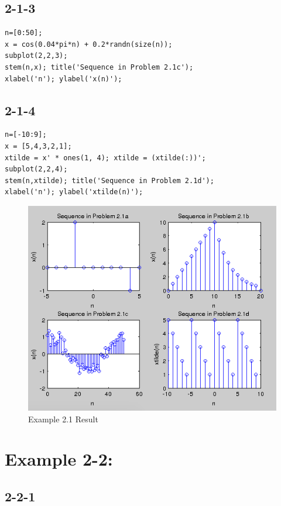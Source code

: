 \documentclass[11pt
  , a4paper
  , article
  , oneside
]{memoir}
\begin{document}
\section{2-1-3}
\begin{lstlisting}[style=termstyle]
n=[0:50];
x = cos(0.04*pi*n) + 0.2*randn(size(n));
subplot(2,2,3);
stem(n,x); title('Sequence in Problem 2.1c');
xlabel('n'); ylabel('x(n)');
\end{lstlisting}

\section{2-1-4}
\begin{lstlisting}[style=termstyle]
n=[-10:9];
x = [5,4,3,2,1];
xtilde = x' * ones(1, 4); xtilde = (xtilde(:))';
subplot(2,2,4);
stem(n,xtilde); title('Sequence in Problem 2.1d');
xlabel('n'); ylabel('xtilde(n)');
\end{lstlisting}

\begin{figure}[h!]
	\centering
	\includegraphics{./images/ex2-1.png}
	\caption{Example 2.1 Result}
	\label{fig:Example 2.1 Result} 
\end{figure}

\chapter{Example 2-2:}

\section{2-2-1}
\end{document}

